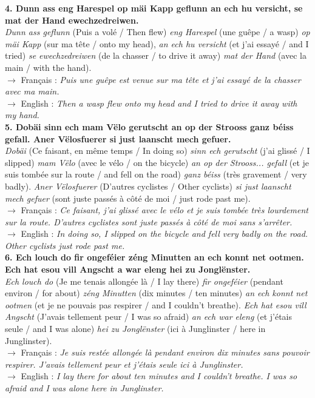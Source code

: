 \noindent\textbf{4. Dunn ass eng Harespel op mäi Kapp geflunn an ech hu versicht, se mat der Hand ewechzedreiwen.}\\
\textit{Dunn ass geflunn} (Puis a volé / Then flew) \textit{eng Harespel} (une guêpe / a wasp) \textit{op mäi Kapp} (sur ma tête / onto my head), \textit{an ech hu versicht} (et j'ai essayé / and I tried) \textit{se ewechzedreiwen} (de la chasser / to drive it away) \textit{mat der Hand} (avec la main / with the hand).\\
$\rightarrow$ Français : \textit{Puis une guêpe est venue sur ma tête et j'ai essayé de la chasser avec ma main.}\\
$\rightarrow$ English : \textit{Then a wasp flew onto my head and I tried to drive it away with my hand.}\\[0.5em]

\noindent\textbf{5. Dobäi sinn ech mam Vëlo gerutscht an op der Strooss ganz béiss gefall. Aner Vëlosfuerer si just laanscht mech gefuer.}\\
\textit{Dobäi} (Ce faisant, en même temps / In doing so) \textit{sinn ech gerutscht} (j'ai glissé / I slipped) \textit{mam Vëlo} (avec le vélo / on the bicycle) \textit{an op der Strooss... gefall} (et je suis tombée sur la route / and fell on the road) \textit{ganz béiss} (très gravement / very badly). \textit{Aner Vëlosfuerer} (D'autres cyclistes / Other cyclists) \textit{si just laanscht mech gefuer} (sont juste passés à côté de moi / just rode past me).\\
$\rightarrow$ Français : \textit{Ce faisant, j'ai glissé avec le vélo et je suis tombée très lourdement sur la route. D'autres cyclistes sont juste passés à côté de moi sans s'arrêter.}\\
$\rightarrow$ English : \textit{In doing so, I slipped on the bicycle and fell very badly on the road. Other cyclists just rode past me.}\\[0.5em]

\noindent\textbf{6. Ech louch do fir ongeféier zéng Minutten an ech konnt net ootmen. Ech hat esou vill Angscht a war eleng hei zu Jonglënster.}\\
\textit{Ech louch do} (Je me tenais allongée là / I lay there) \textit{fir ongeféier} (pendant environ / for about) \textit{zéng Minutten} (dix minutes / ten minutes) \textit{an ech konnt net ootmen} (et je ne pouvais pas respirer / and I couldn't breathe). \textit{Ech hat esou vill Angscht} (J'avais tellement peur / I was so afraid) \textit{an ech war eleng} (et j'étais seule / and I was alone) \textit{hei zu Jonglënster} (ici à Junglinster / here in Junglinster).\\
$\rightarrow$ Français : \textit{Je suis restée allongée là pendant environ dix minutes sans pouvoir respirer. J'avais tellement peur et j'étais seule ici à Junglinster.}\\
$\rightarrow$ English : \textit{I lay there for about ten minutes and I couldn't breathe. I was so afraid and I was alone here in Junglinster.}\\[0.5em]

